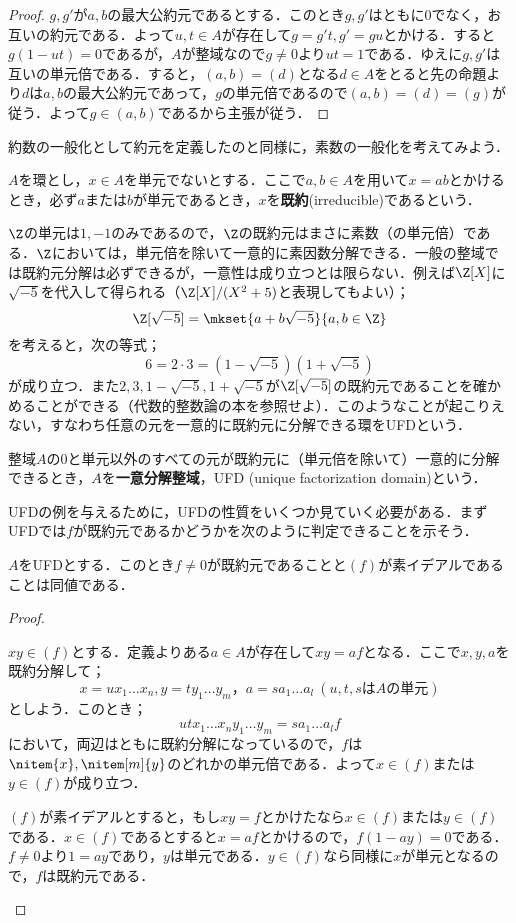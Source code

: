 \begin{proof}
	$g,g'$が$a,b$の最大公約元であるとする．このとき$g,g'$はともに0でなく，お互いの約元である．よって$u,t\in A$が存在して$g=g't,g'=gu$とかける．すると$g(1-ut)=0$であるが，$A$が整域なので$g\neq0$より$ut=1$である．ゆえに$g,g'$は互いの単元倍である．すると，$(a,b)=(d)$となる$d\in A$をとると先の命題より$d$は$a,b$の最大公約元であって，$g$の単元倍であるので$(a,b)=(d)=(g)$が従う．よって$g\in (a,b)$であるから主張が従う．
\end{proof}

約数の一般化として約元を定義したのと同様に，素数の一般化を考えてみよう．

\begin{defi}[既約元]\label{defi:既約元}
	$A$を環とし，$x\in A$を単元でないとする．ここで$a,b\in A$を用いて$x=ab$とかけるとき，必ず$a$または$b$が単元であるとき，$x$を\textbf{既約}(irreducible)であるという．
\end{defi}

$\Z$の単元は$1,-1$のみであるので，$\Z$の既約元はまさに素数（の単元倍）である．$\Z$においては，単元倍を除いて一意的に素因数分解できる．一般の整域では既約元分解は必ずできるが，一意性は成り立つとは限らない．例えば$\Z[X]$に$\sqrt{-5}$を代入して得られる（$\Z[X]/(X^2+5)$と表現してもよい）；
\[\Z[\sqrt{-5}]=\mkset{a+b\sqrt{-5}}{a,b\in\Z}\]
を考えると，次の等式；
\[6=2\cdot 3=(1-\sqrt{-5})(1+\sqrt{-5})\]
が成り立つ．また$2,3,1-\sqrt{-5},1+\sqrt{-5}$が$\Z[\sqrt{-5}]$の既約元であることを確かめることができる（代数的整数論の本を参照せよ）．このようなことが起こりえない，すなわち任意の元を一意的に既約元に分解できる環をUFDという．

\begin{defi}[UFD]
	整域$A$の$0$と単元以外のすべての元が既約元に（単元倍を除いて）一意的に分解できるとき，$A$を\textbf{一意分解整域}，UFD (unique factorization domain)という．
\end{defi}

UFDの例を与えるために，UFDの性質をいくつか見ていく必要がある．まずUFDでは$f$が既約元であるかどうかを次のように判定できることを示そう．
\begin{prop}
	$A$をUFDとする．このとき$f\neq0$が既約元であることと$(f)$が素イデアルであることは同値である．
\end{prop}
\begin{proof}
	\begin{eqv}
		\item $xy\in(f)$とする．定義よりある$a\in A$が存在して$xy=af$となる．ここで$x,y,a$を既約分解して；
		\[x=ux_1\dots x_n,y=ty_1\dots y_m，a=sa_1\dots a_l~(u,t,s\text{は}A\text{の単元})\]
		としよう．このとき；
		\[utx_1\dots x_ny_1\dots y_m=sa_1\dots a_lf\]
		において，両辺はともに既約分解になっているので，$f$は$\nitem{x},\nitem[m]{y}$のどれかの単元倍である．よって$x\in(f)$または$y\in(f)$が成り立つ．
		
		\item $(f)$が素イデアルとすると，もし$xy=f$とかけたなら$x\in (f)$または$y\in(f)$である．$x\in (f)$であるとすると$x=af$とかけるので，$f(1-ay)=0$である．$f\neq0$より$1=ay$であり，$y$は単元である．$y\in (f)$なら同様に$x$が単元となるので，$f$は既約元である．
	\end{eqv}
\end{proof}


